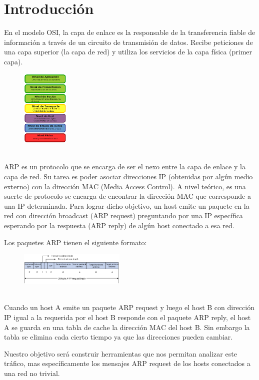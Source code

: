 \section{Introducción}

\PARstart 
En el modelo OSI, la capa de enlace es la responsable de la transferencia fiable
de información a través de un circuito de transmisión de datos. Recibe peticiones de
una capa superior (la capa de red) y utiliza los servicios de la capa física (primer
capa). 
\begin{figure}[h]
  \centering
    \includegraphics[width=0.2\textwidth]{modeloOSI.png}
  \caption{}
  \label{}
\end{figure}
\\
ARP es un protocolo que se encarga de ser el nexo entre la capa de enlace y la capa de red. 
Su tarea es poder asociar direcciones IP (obtenidas por algún medio externo) con la dirección MAC (Media Access Control).
A nivel teórico, es una suerte de protocolo se encarga de encontrar la dirección MAC que corresponde a una IP determinada.
Para lograr dicho objetivo, un host emite un paquete en la red con dirección broadcast (ARP request) preguntando
por una IP específica esperando por la respuesta (ARP reply) de algún host conectado a esa red. 


Los paquetes ARP tienen el siguiente formato:
\begin{figure}[!h]
  \centering
    \includegraphics[width=0.45\textwidth]{arpPacket.png}
  \caption{}
  \label{}
\end{figure}
\\
Cuando un host A emite un paquete ARP request y luego el host B con dirección IP igual a la requerida por el host B
responde con el paquete ARP reply, el host A se guarda en una tabla de cache la dirección MAC del host B.
Sin embargo la tabla se elimina cada cierto tiempo ya que las direcciones pueden cambiar.

Nuestro objetivo será construir herramientas que nos permitan analizar este tráfico,
mas específicamente los mensajes ARP request de los hosts conectados a una red no trivial.
